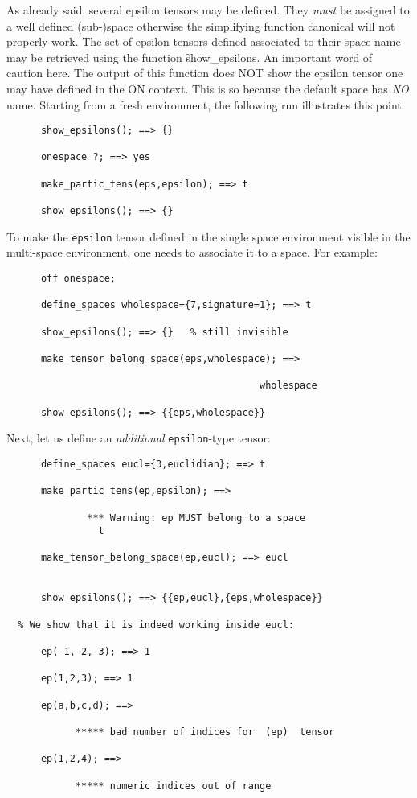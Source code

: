As already said, several epsilon tensors may be defined. They \emph{must}
be assigned to a well defined (sub-)space otherwise the simplifying
function \f{canonical} will not properly work.
The set of epsilon tensors defined  associated to their space-name
may be retrieved using the function
\hypertarget{operator:SHOW_EPSILONS}{\f{show\_epsilons}}.
An important word of caution here. The output of this function does NOT
show the epsilon tensor one may have defined in the ON  context.
This is so because the default space has \emph{NO} name.
Starting  from a fresh environment, the following run illustrates
this point:
\begin{verbatim}
      show_epsilons(); ==> {}

      onespace ?; ==> yes

      make_partic_tens(eps,epsilon); ==> t

      show_epsilons(); ==> {}
\end{verbatim}
To make the \texttt{epsilon} tensor defined in the single space environment
visible in the multi-space environment, one needs to associate it to
a space.
For example:
\begin{verbatim}
      off onespace;

      define_spaces wholespace={7,signature=1}; ==> t

      show_epsilons(); ==> {}   % still invisible

      make_tensor_belong_space(eps,wholespace); ==>

                                            wholespace

      show_epsilons(); ==> {{eps,wholespace}}
\end{verbatim}
Next, let us define an \emph{additional} \texttt{epsilon}-type tensor:
\begin{verbatim}
      define_spaces eucl={3,euclidian}; ==> t

      make_partic_tens(ep,epsilon); ==>

              *** Warning: ep MUST belong to a space
                t

      make_tensor_belong_space(ep,eucl); ==> eucl


      show_epsilons(); ==> {{ep,eucl},{eps,wholespace}}

  % We show that it is indeed working inside eucl:

      ep(-1,-2,-3); ==> 1

      ep(1,2,3); ==> 1

      ep(a,b,c,d); ==>

            ***** bad number of indices for  (ep)  tensor

      ep(1,2,4); ==>

            ***** numeric indices out of range
\end{verbatim}
